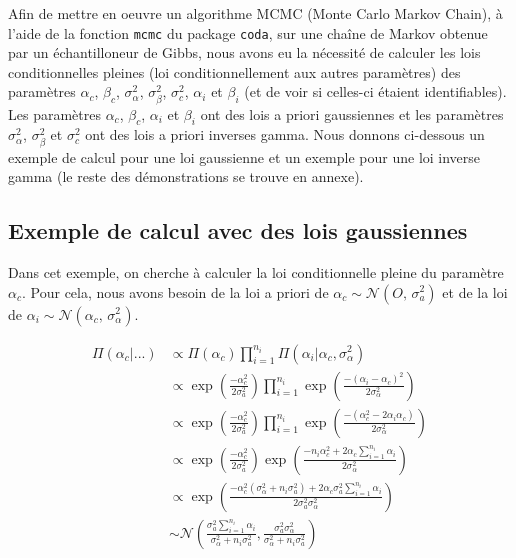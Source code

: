 \documentclass[
]{article}
\begin{document}
Afin de mettre en oeuvre un algorithme MCMC (Monte Carlo Markov Chain),
à l'aide de la fonction \texttt{mcmc} du package \texttt{coda}, sur une
chaîne de Markov obtenue par un échantilloneur de Gibbs, nous avons eu
la nécessité de calculer les lois conditionnelles pleines (loi
conditionnellement aux autres paramètres) des paramètres \(\alpha_c\),
\(\beta_c\), \(\sigma_{\alpha}^2\), \(\sigma_{\beta}^2\),
\(\sigma_c ^2\), \(\alpha_i\) et \(\beta_i\) (et de voir si celles-ci
étaient identifiables). Les paramètres \(\alpha_c\), \(\beta_c\),
\(\alpha_i\) et \(\beta_i\) ont des lois a priori gaussiennes et les
paramètres \(\sigma_{\alpha}^2\), \(\sigma_{\beta}^2\) et
\(\sigma_c ^2\) ont des lois a priori inverses gamma. Nous donnons
ci-dessous un exemple de calcul pour une loi gaussienne et un exemple
pour une loi inverse gamma (le reste des démonstrations se trouve en
annexe).

\hypertarget{exemple-de-calcul-avec-des-lois-gaussiennes}{%
\subsection{Exemple de calcul avec des lois
gaussiennes}\label{exemple-de-calcul-avec-des-lois-gaussiennes}}

Dans cet exemple, on cherche à calculer la loi conditionnelle pleine du
paramètre \(\alpha_c\). Pour cela, nous avons besoin de la loi a priori
de \(\alpha_{c} \sim \mathcal{N}(O,\,\sigma_{a}^{2})\) et de la loi de
\(\alpha_{i} \sim \mathcal{N}(\alpha_{c},\,\sigma_{\alpha}^{2})\).

\begin{align*}
\Pi(\alpha_{c}|...) &\propto \Pi(\alpha_{c}) \prod_{i=1}^{n_{i}} \Pi(\alpha_{i}|\alpha_{c},\sigma_{\alpha}^{2} ) \\
        &\propto \exp\left(\frac{-\alpha_{c}^{2}}{2\sigma_{a}^{2}}\right)\prod_{i=1}^{n_{i}} \exp\left(\frac{-(\alpha_{i}-\alpha_{c})^{2}}{2\sigma_{\alpha}^{2}}\right) \\
        &\propto \exp\left(\frac{-\alpha_{c}^{2}}{2\sigma_{a}^{2}}\right)\prod_{i=1}^{n_{i}} \exp\left(\frac{-(\alpha_{c}^{2}-2\alpha_{i}\alpha_{c})}{2\sigma_{\alpha}^{2}}\right) \\
        &\propto \exp\left(\frac{-\alpha_{c}^{2}}{2\sigma_{a}^{2}}\right) \exp\left(\frac{-n_i\alpha_{c}^{2}+2\alpha_{c}\sum\limits_{i=1}^{n_{i}} \alpha_{i}}{2\sigma_{\alpha}^{2}}\right)\\
        &\propto \exp\left(\frac{-\alpha_{c}^{2}(\sigma_{\alpha}^{2}+n_i\sigma_{a}^{2}) +2\alpha_{c}\sigma_{a}^{2}\sum\limits_{i=1}^{n_{i}} \alpha_{i}}{2\sigma_{a}^{2}\sigma_{\alpha}^{2}}\right)\\
        &\sim \mathcal{N}\left(\frac{\sigma_{a}^{2}\sum\limits_{i=1}^{n_{i}} \alpha_{i}}{\sigma_{\alpha}^{2}+n_{i}\sigma_{a}^{2}},\frac{\sigma_{a}^{2}\sigma_{\alpha}^{2}}{\sigma_{\alpha}^{2}+n_{i}\sigma_{a}^{2}}\right)
\end{align*}
\end{document}
